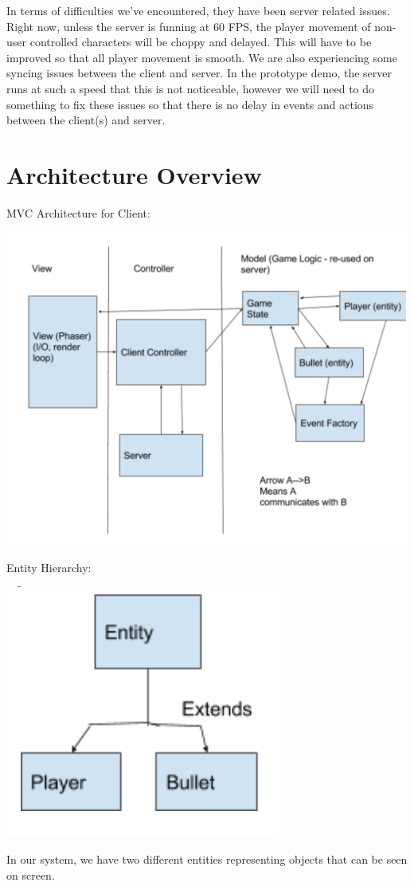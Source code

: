\documentclass[11pt, oneside]{article}   	%
\begin{document}
In terms of difficulties we've encountered, they have been server related issues.
Right now, unless the server is funning at 60 FPS, the player movement of non-user controlled characters will be choppy and delayed.
This will have to be improved so that all player movement is smooth.
We are also experiencing some syncing issues between the client and server.
In the prototype demo, the server runs at such a speed that this is not noticeable,
however we will need to do something to fix these issues so that there is no delay in events and actions between the client(s) and server.

\clearpage

\section{Architecture Overview}

MVC Architecture for Client:\\
\begin{center}
\includegraphics[scale=0.7]{images/mvc-architecture.png}
\end{center}

Entity Hierarchy:\\
\begin{center}
\includegraphics[scale=0.9]{images/entity-hierarchy.png}
\end{center}
In our system, we have two different entities representing objects that can be seen on screen.\\
\end{document}
